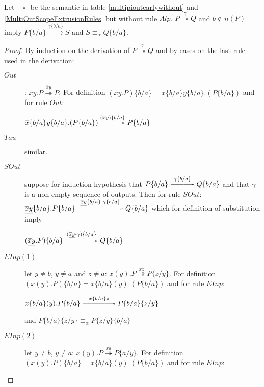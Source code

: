 \begin{lemma}\label{propagationOfSubstitionNBOverTransition}
  Let $\twoheadrightarrow$ be the semantic in table \ref{multipioutearlywithout} and \ref{MultiOutScopeExtrusionRules} but without rule $Alp$. $P \stackrel{\gamma}{\twoheadrightarrow} Q$ and $b\notin n(P)$ imply $P\{b/a\}  \xrightarrow{\gamma\{b/a\}} S$ and $S \equiv_{\alpha} Q\{b/a\}$.
  \begin{proof}
    By induction on the derivation of $P \stackrel{\gamma}{\twoheadrightarrow} Q$ and by cases on the last rule used in the derivation:
    \begin{description}
      \item[$Out$]: $\overline{x}y.P \stackrel{\overline{x}y}{\twoheadrightarrow} P$. For definition $(\overline{x}y.P)\{b/a\} =\overline{x}\{b/a\}y\{b/a\}.(P\{b/a\} )$ and for rule $Out$:
	\begin{center}
	  $\overline{x}\{b/a\}y\{b/a\}.(P\{b/a\} ) \stackrel{(\overline{x}y)\{b/a\}}{\verylongtwoheadrightarrow} P\{b/a\} $
	\end{center}
      \item[$Tau$] similar.
      \item[$SOut$]
	suppose for induction hypothesis that $P\{b/a\}  \stackrel{\gamma\{b/a\}}{\verylongtwoheadrightarrow} Q\{b/a\} $ and that $\gamma$ is a non empty sequence of outputs. Then for rule $SOut$: $\underline{\overline{x}y}\{b/a\}.P\{b/a\}  \stackrel{\underline{\overline{x}y}\{b/a\} \cdot \gamma\{b/a\}}{\HeartAttacktwoheadrightarrow} Q\{b/a\} $ which for definition of substitution imply 
	\begin{center}
	  $(\underline{\overline{x}y}.P)\{b/a\}  \stackrel{(\underline{\overline{x}y} \cdot \gamma)\{b/a\}}{\HUGEtwoheadrightarrow} Q\{b/a\}$
	\end{center}
      \item[$EInp(1)$] let $y\neq b$, $y\neq a$ and $z\neq a$:
	$x(y).P \stackrel{xz}{\twoheadrightarrow} P\{z/y\}$. For definition $(x(y).P)\{b/a\} =x\{b/a\}(y).(P\{b/a\})$ and for rule $EInp$: 
	\begin{center}
	  $x\{b/a\}(y).P\{b/a\}  \stackrel{x\{b/a\}z}{\HUGEtwoheadrightarrow} P\{b/a\} \{z/y\}$ 
	\end{center}
	and $P\{b/a\}\{z/y\} \equiv_{\alpha} P\{z/y\}\{b/a\}$
      \item[$EInp(2)$] let $y\neq b$, $y\neq a$:
	$x(y).P \stackrel{xa}{\twoheadrightarrow} P\{a/y\}$. For definition $(x(y).P)\{b/a\} =x\{b/a\}(y).(P\{b/a\})$ and for rule $EInp$: 
	\begin{center}

\end{center}
\end{description}
\end{proof}
\end{lemma}
